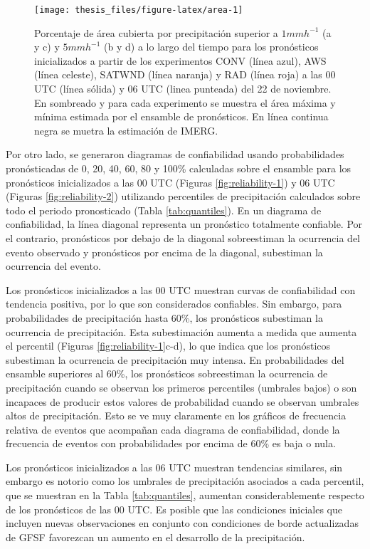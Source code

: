 \documentclass[12pt,oneside]{reedthesis}
\begin{document}
\begin{figure}
\texttt{[image: thesis\_files/figure-latex/area-1]} \caption{Porcentaje de área cubierta por precipitación superior a \(1 mmh^{-1}\) (a y c) y \(5 mmh^{-1}\) (b y d) a lo largo del tiempo para los pronósticos inicializados a partir de los experimentos CONV (línea azul), AWS (línea celeste), SATWND (línea naranja) y RAD (línea roja) a las 00 UTC (línea sólida) y 06 UTC (linea punteada) del 22 de noviembre. En sombreado y para cada experimento se muestra el área máxima y mínima estimada por el ensamble de pronósticos. En línea continua negra se muetra la estimación de IMERG.}\label{fig:area}
\end{figure}
Por otro lado, se generaron diagramas de confiabilidad usando probabilidades pronósticadas de 0, 20, 40, 60, 80 y 100\% calculadas sobre el ensamble para los pronósticos inicializados a las 00 UTC (Figuras \ref{fig:reliability-1}) y 06 UTC (Figuras \ref{fig:reliability-2}) utilizando percentiles de precipitación calculados sobre todo el periodo pronosticado (Tabla \ref{tab:quantiles}). En un diagrama de confiabilidad, la línea diagonal representa un pronóstico totalmente confiable. Por el contrario, pronósticos por debajo de la diagonal sobreestiman la ocurrencia del evento observado y pronósticos por encima de la diagonal, subestiman la ocurrencia del evento.

Los pronósticos inicializados a las 00 UTC muestran curvas de confiabilidad con tendencia positiva, por lo que son considerados confiables. Sin embargo, para probabilidades de precipitación hasta 60\%, los pronósticos subestiman la ocurrencia de precipitación. Esta subestimación aumenta a medida que aumenta el percentil (Figuras \ref{fig:reliability-1}c-d), lo que indica que los pronósticos subestiman la ocurrencia de precipitación muy intensa. En probabilidades del ensamble superiores al 60\%, los pronósticos sobreestiman la ocurrencia de precipitación cuando se observan los primeros percentiles (umbrales bajos) o son incapaces de producir estos valores de probabilidad cuando se observan umbrales altos de precipitación. Esto se ve muy claramente en los gráficos de frecuencia relativa de eventos que acompañan cada diagrama de confiabilidad, donde la frecuencia de eventos con probabilidades por encima de 60\% es baja o nula.

Los pronósticos inicializados a las 06 UTC muestran tendencias similares, sin embargo es notorio como los umbrales de precipitación asociados a cada percentil, que se muestran en la Tabla \ref{tab:quantiles}, aumentan considerablemente respecto de los pronósticos de las 00 UTC. Es posible que las condiciones iniciales que incluyen nuevas observaciones en conjunto con condiciones de borde actualizadas de GFSF favorezcan un aumento en el desarrollo de la precipitación.
\end{document}
